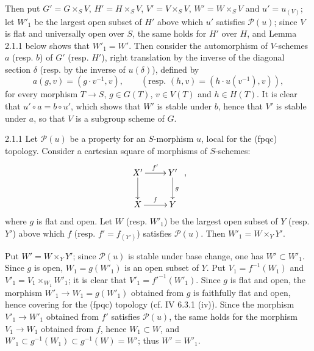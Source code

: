 Then put $G'=G\times_SV$, $H'=H\times_SV$, $V'=V\times_SV$, $W'=W\times_SV$ and $u'=u_{(V)}$; let $W'_1$ be the largest open subset of $H'$ above which $u'$ satisfies $\mathscr P(u)$; since $V$ is flat and universally open over $S$, the same holds for $H'$ over $H$, and Lemma 2.1.1 below shows that $W'_1=W'$. Then consider the automorphism of $V$-schemes $a$ (resp. $b$) of $G'$ (resp. $H'$), right translation by the inverse of the diagonal section $\delta$ (resp. by the inverse of $u(\delta)$), defined by
\[
a(g,v)=(g\cdot v^{-1},v),\qquad
(\text{resp. }(h,v)=(h\cdot u(v^{-1}),v)),
\]
for every morphism $T\to S$, $g\in G(T)$, $v\in V(T)$ and $h\in H(T)$. It is clear that $u'\circ a=b\circ u'$, which shows that $W'$ is stable under $b$, hence that $V'$ is stable under $a$, so that $V$ is a subgroup scheme of $G$.
\begin{lemma}{2.1.1}\label{VIB.2.1.1}
Let $\mathscr P(u)$ be a property for an $S$-morphism $u$, local for the (fpqc) topology. Consider a cartesian square of morphisms of $S$-schemes:
\[
\xymatrix{X'\ar[r]^{f'}\ar[d]&Y'\ar[d]^g\\X\ar[r]^f&Y}\ ,
\]
where $g$ is flat and open. Let $W$ (resp. $W'_1$) be the largest open subset of $Y$ (resp. $Y'$) above which $f$ (resp. $f'=f_{(Y')}$) satisfies $\mathscr P(u)$. Then $W'_1=W\times_YY'$.
\end{lemma}
Put $W'=W\times_YY'$; since $\mathscr P(u)$ is stable under base change, one has $W'\subset W'_1$. Since $g$ is open, $W_1=g(W'_1)$ is an open subset of $Y$. Put $V_1=f^{-1}(W_1)$ and $V'_1=V_1\times_{W_1}W'_1$; it is clear that $V'_1=f'^{-1}(W'_1)$. Since $g$ is flat and open, the morphism $W'_1\to W_1=g(W'_1)$ obtained from $g$ is faithfully flat and open, hence covering for the (fpqc) topology (cf. IV 6.3.1 (iv)). Since the morphism $V'_1\to W'_1$ obtained from $f'$ satisfies $\mathscr P(u)$, the same holds for the morphism $V_1\to W_1$ obtained from $f$, hence $W_1\subset W$, and $W'_1\subset g^{-1}(W_1)\subset g^{-1}(W)=W'$; thus $W'=W'_1$.
